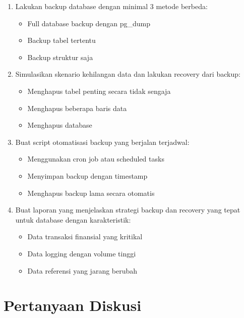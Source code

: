\begin{enumerate}
    \item Lakukan backup database dengan minimal 3 metode berbeda:
    \begin{itemize}
        \item Full database backup dengan pg\_dump
        \item Backup tabel tertentu
        \item Backup struktur saja
    \end{itemize}
    
    \item Simulasikan skenario kehilangan data dan lakukan recovery dari backup:
    \begin{itemize}
        \item Menghapus tabel penting secara tidak sengaja
        \item Menghapus beberapa baris data
        \item Menghapus database
    \end{itemize}
    
    \item Buat script otomatisasi backup yang berjalan terjadwal:
    \begin{itemize}
        \item Menggunakan cron job atau scheduled tasks
        \item Menyimpan backup dengan timestamp
        \item Menghapus backup lama secara otomatis
    \end{itemize}
    
    \item Buat laporan yang menjelaskan strategi backup dan recovery yang tepat untuk database dengan karakteristik:
    \begin{itemize}
        \item Data transaksi finansial yang kritikal
        \item Data logging dengan volume tinggi
        \item Data referensi yang jarang berubah
    \end{itemize}
\end{enumerate}

\section{Pertanyaan Diskusi}

